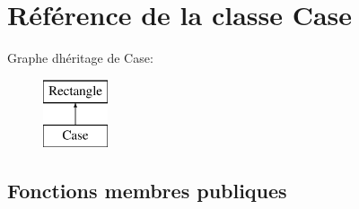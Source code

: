 \hypertarget{class_case}{}\section{Référence de la classe Case}
\label{class_case}
Graphe d\textquotesingle{}héritage de Case\+:\begin{figure}[H]
\begin{center}
\leavevmode
\includegraphics[height=2.000000cm]{class_case}
\end{center}
\end{figure}
\subsection*{Fonctions membres publiques}
